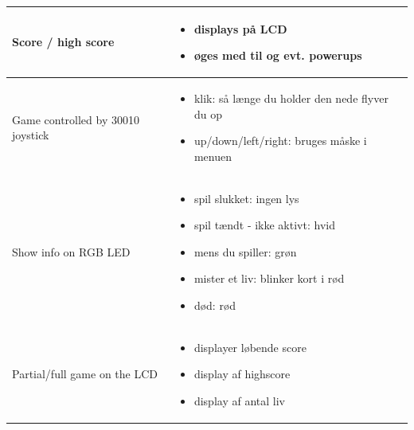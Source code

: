 \begin{table}[h!]
\begin{tabularx}{\textwidth}{|l|X|}
Score / high score & 
\begin{itemize}[leftmargin=*]
    \item displays på LCD
    \item øges med til og evt. powerups
\end{itemize} \\
\hline
Game controlled by 30010 joystick & 
\begin{itemize}[leftmargin=*]
    \item klik: så længe du holder den nede flyver du op
    \item up/down/left/right: bruges måske i menuen
\end{itemize} \\
\hline
Show info on RGB LED &
\begin{itemize}[leftmargin=*]
    \item spil slukket: ingen lys
    \item spil tændt - ikke aktivt: hvid
    \item mens du spiller: grøn
    \item mister et liv: blinker kort i rød
    \item død: rød
\end{itemize} \\
\hline
Partial/full game on the LCD &
\begin{itemize}[leftmargin=*]
    \item displayer løbende score
    \item display af highscore
    \item display af antal liv
\end{itemize}
\end{tabularx}
\end{table}

